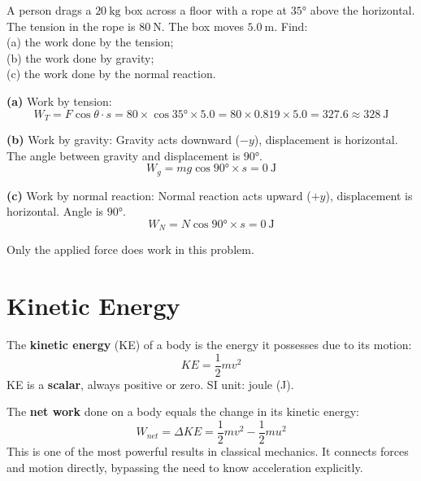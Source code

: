 \begin{examplebox}[5.1]
A person drags a $20\ \text{kg}$ box across a floor
with a rope at $35°$ above the horizontal. The tension
in the rope is $80\ \text{N}$. The box moves $5.0\ \text{m}$.
Find:\\
(a) the work done by the tension;\\
(b) the work done by gravity;\\
(c) the work done by the normal reaction.
\end{examplebox}

\begin{solutionbox}
\textbf{(a)} Work by tension:
\[
  W_T = F\cos\theta \cdot s
  = 80 \times \cos 35° \times 5.0
  = 80 \times 0.819 \times 5.0
  = 327.6 \approx 328\ \text{J}
\]

\textbf{(b)} Work by gravity: Gravity acts downward
($-y$), displacement is horizontal. The angle between
gravity and displacement is $90°$.
\[
  W_g = mg\cos 90° \times s = 0\ \text{J}
\]

\textbf{(c)} Work by normal reaction: Normal reaction
acts upward ($+y$), displacement is horizontal.
Angle is $90°$.
\[
  W_N = N\cos 90° \times s = 0\ \text{J}
\]

Only the applied force does work in this problem.
\end{solutionbox}

\section{Kinetic Energy}

\begin{definitionbox}
The \textbf{kinetic energy} (KE) of a body is the energy
it possesses due to its motion:
\[
  KE = \frac{1}{2}mv^2
\]
KE is a \textbf{scalar}, always positive or zero.
SI unit: joule (J).
\end{definitionbox}

\begin{lawbox}
The \textbf{net work} done on a body equals the change
in its kinetic energy:
\[
  W_{net} = \Delta KE = \frac{1}{2}mv^2 - \frac{1}{2}mu^2
\]
This is one of the most powerful results in classical
mechanics. It connects forces and motion directly,
bypassing the need to know acceleration explicitly.
\end{lawbox}

